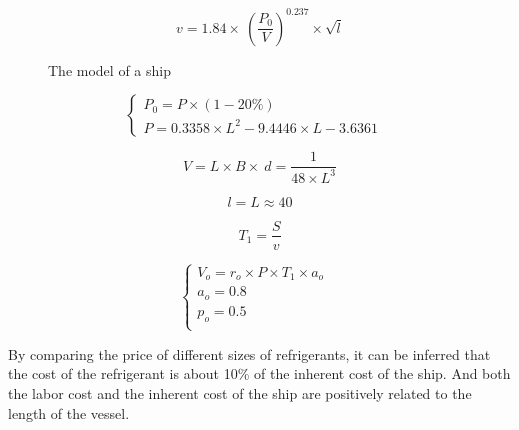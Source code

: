 \documentclass{mcmthesis}
\begin{document}
\begin{equation}\label{1}
v=1.84\times \ (\frac{P_0}{V}) ^{0.237} \times \sqrt{l}
\end{equation}

\begin{figure}[tbp]
  \caption{The model of a ship}\label{figure1}
\end{figure}

\begin{equation}
\left\{
\begin{array}{lr}
P_0=P \times (1-20\%) &\\
P= 0.3358\times L^2 -9.4446\times L - 3.6361

\end{array}
\right.
\end{equation}



\begin{equation}\label{3}
V=L\times B\times\ d =\frac{1}{48\times L^3}
\end{equation}

\begin{equation}\label{4}
l=L\approx 40
\end{equation}

\begin{equation}\label{4}
T_1=\frac{S}{v}
\end{equation}

\begin{equation}
\left\{
\begin{array}{lr}
V_o=r_o \times P \times T_1 \times a_o &\\
a_o=0.8  & \\    p_o=0.5 \\
\end{array}
\right.
\end{equation}

By comparing the price of different sizes of refrigerants, it can be inferred that the cost of the refrigerant is about 10\% of the inherent cost of the ship. And both the labor cost and the inherent cost of the ship are positively related to the length of the vessel.
\end{document}
